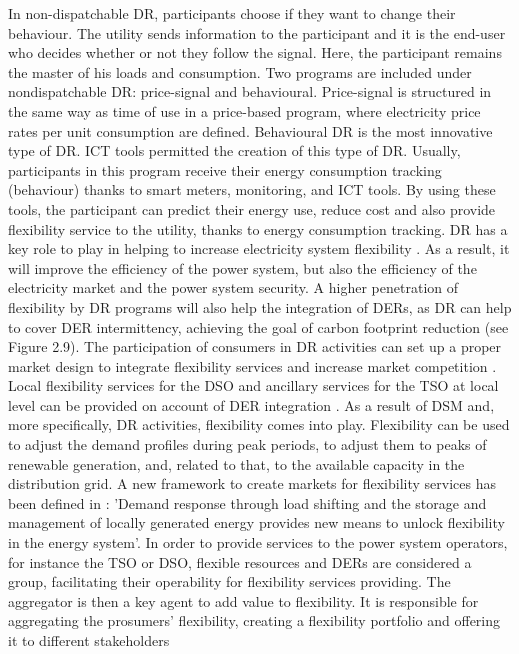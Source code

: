 In non-dispatchable DR, participants choose if they want to change their behaviour. The utility sends information to the participant and it is the end-user who decides whether or not they follow the signal. Here, the participant remains the master of his loads and consumption. Two programs are included under nondispatchable DR: price-signal and behavioural. Price-signal is structured in the same way as time of use in a price-based program, where electricity price rates per unit consumption are defined. Behavioural DR is the
most innovative type of DR. ICT tools permitted the creation of this type of DR. Usually, participants in this program receive their energy consumption tracking (behaviour) thanks to smart meters, monitoring, and ICT tools. By using these tools, the participant can predict their energy use, reduce cost and also provide flexibility service to the utility, thanks to energy consumption tracking.
DR has a key role to play in helping to increase electricity system flexibility \cite{Cooke2011}. As a result, it will improve the efficiency of the power system, but also the efficiency of the electricity market and the power system security. A higher penetration of flexibility by DR programs will also help the integration of DERs, as DR can help to cover DER intermittency, achieving the goal of carbon footprint reduction (see Figure 2.9).
The participation of consumers in DR activities can set up a proper market design to integrate flexibility services and increase market competition \cite{MarketDesignENTSOE}. Local flexibility services for the DSO and ancillary services for the TSO at local level can be provided on account of DER integration \cite{Roques2017}.
As a result of DSM and, more specifically, DR activities, flexibility comes into play. Flexibility can be used to adjust the demand profiles during peak periods, to adjust them to peaks of renewable generation, and, related to that, to the available capacity in the distribution grid.
A new framework to create markets for flexibility services has been defined in \cite{Ulbig2015,USEFFoundation2015a}: 'Demand response through load shifting and the storage and management of locally generated energy provides new means to unlock flexibility in the energy system'. In order to provide services to the power system operators, for instance the TSO or DSO, flexible resources and DERs are considered a group, facilitating their operability for flexibility services providing. The aggregator is then a key agent to add value to flexibility. It is responsible for aggregating the prosumers' flexibility, creating a flexibility portfolio and offering it to different stakeholders
